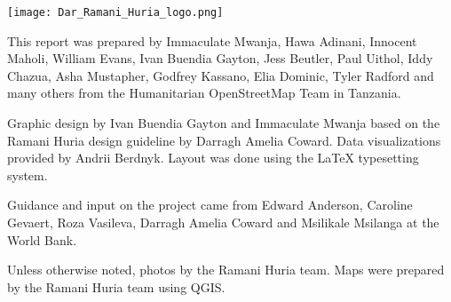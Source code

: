 \documentclass[a4paper,12pt,twoside]{article}
\begin{document}

%  
  

  

\newpage
\color{RHgrey}

\begin{center}
{\texttt{[image: Dar\_Ramani\_Huria\_logo.png]}}
\end{center}

This report was prepared by Immaculate Mwanja, Hawa Adinani, Innocent Maholi, William Evans, Ivan Buendia Gayton, Jess Beutler, Paul Uithol, Iddy Chazua, Asha Mustapher, Godfrey Kassano, Elia Dominic, Tyler Radford and many others from the Humanitarian OpenStreetMap Team in Tanzania.

Graphic design by Ivan Buendia Gayton and Immaculate Mwanja based on the Ramani Huria design guideline by Darragh Amelia Coward. Data visualizations provided by 
Andrii Berdnyk. Layout was done using the \LaTeX{} typesetting system.

Guidance and input on the project came from Edward Anderson, Caroline Gevaert, Roza Vasileva, Darragh Amelia Coward and Msilikale Msilanga at the World Bank.

Unless otherwise noted, photos by the Ramani Huria team. Maps were prepared by the Ramani Huria team using QGIS.



\bigskip\bigskip\bigskip
\end{document}

